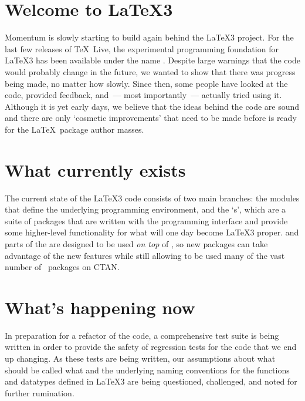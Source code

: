 \documentclass{ltnews}
\begin{document}
\maketitle

\section{Welcome to \LaTeX3}

Momentum is slowly starting to build again behind the \LaTeX3 project. For the
last few releases of \TeX~Live, the experimental programming foundation for
\LaTeX3 has been available under the name . Despite large
warnings that the code would probably change in the future, we wanted to show
that there was progress being made, no matter how slowly. Since then, some
people have looked at the code, provided feedback, and~--- most
importantly~--- actually tried using it. Although it is yet early days, we
believe that the ideas behind the code are sound and there are only `cosmetic
improvements' that need to be made before  is ready for the
\LaTeX~package author masses.

\section{What currently exists}

The current state of the \LaTeX3 code consists of two main branches: the
 modules that define the underlying programming environment,
and the `s', which are a suite of packages that are written
with the  programming interface and provide some higher-level
functionality for what will one day become \LaTeX3 proper.  and
parts of the  are designed to be used \emph{on top} of
\LaTeXe, so new packages can take advantage of the new features while still
allowing to be used many of the vast number of \LaTeXe\ packages on CTAN.

\section{What's happening now}

In preparation for a refactor of the  code, a comprehensive
test suite is being written in order to provide the safety of regression tests
for the code that we end up changing. As these tests are being written, our
assumptions about what should be called what and the underlying naming
conventions for the functions and datatypes defined in \LaTeX3 are being
questioned, challenged, and noted for further rumination.
\end{document}
